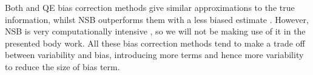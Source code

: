 Both  and \ac{QE} bias correction methods give similar approximations to the true information, whilst \ac{NSB} outperforms them with a less biased estimate \citep{Panzeri2007}.
However, \ac{NSB} is very computationally intensive \citep{Panzeri2007}, so we will not be making use of it in the presented body work.
All these bias correction methods tend to make a trade off between variability and bias, introducing more terms and hence more variability to reduce the size of bias term.






